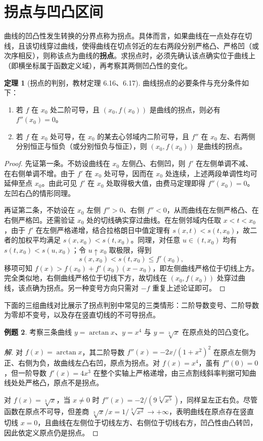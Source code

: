 \documentclass[UTF8,fontset=fandol,a4paper,12pt]{ctexart}
\theoremstyle{definition}
\newtheorem{theorem}{定理}[section]
\newtheorem{example}[theorem]{例题}
\begin{document}
\section{拐点与凹凸区间}
曲线的凹凸性发生转换的分界点称为拐点。具体而言，如果曲线在一点处存在切线，且该切线穿过曲线，使得曲线在切点邻近的左右两段分别严格凸、严格凹（或次序相反），则称该点为曲线的\textbf{拐点}。求拐点时，必须先确认该点确实位于曲线上（即横坐标属于函数定义域），再考察其两侧凹凸性的变化。

\begin{theorem}[拐点的判别，教材定理 6.16、6.17]
曲线拐点的必要条件与充分条件如下：
\begin{enumerate}
\item 若 $f$ 在 $x_0$ 处二阶可导，且 $(x_0,f(x_0))$ 是曲线的拐点，则必有 $f''(x_0)=0$。
\item 若 $f$ 在 $x_0$ 处可导，在 $x_0$ 的某去心邻域内二阶可导，且 $f''$ 在 $x_0$ 左、右两侧分别恒正与恒负（或分别恒负与恒正），则 $(x_0,f(x_0))$ 是曲线的拐点。
\end{enumerate}
\end{theorem}

\begin{proof}
先证第一条。不妨设曲线在 $x_0$ 左侧凸、右侧凹，则 $f'$ 在左侧单调不减、在右侧单调不增。由于 $f'$ 在 $x_0$ 处可导，因而在 $x_0$ 处连续，上述两段单调性均可延伸至点 $x_0$。由此可见 $f'$ 在 $x_0$ 处取得极大值，由费马定理即得 $f''(x_0)=0$。左凹右凸的情形同理。

再证第二条，不妨设在 $x_0$ 左侧 $f''>0$、右侧 $f''<0$，从而曲线在左侧严格凸、在右侧严格凹。还需验证 $x_0$ 处的切线确实穿过曲线。在左侧邻域内任取 $x<t<x_0$，由于 $f'$ 在左侧严格递增，结合拉格朗日中值定理有 $s(x,t)<s(t,x_0)$，故二者的加权平均满足 $s(x,x_0)<s(t,x_0)$。同理，对任意 $u\in(t,x_0)$ 均有 $s(t,x_0)<s(u,x_0)$；令 $u\uparrow x_0$ 取极限，得到
\[
 s(x,x_0)<s(t,x_0)\le f'(x_0),
\]
移项可知 $f(x)>f(x_0)+f'(x_0)(x-x_0)$，即左侧曲线严格位于切线上方。完全类似地，右侧曲线严格位于切线下方，故切线在 $(x_0,f(x_0))$ 处穿过曲线，该点确为拐点。另一种变号方向只需对 $-f$ 重复上述论证即可。
\end{proof}

下面的三组曲线对比展示了拐点判别中常见的三类情形：二阶导数变号、二阶导数为零却不变号，以及存在竖直切线的不可导拐点。

\begin{example}
考察三条曲线 $y=\arctan x$、$y=x^4$ 与 $y=\sqrt[3]{x}$ 在原点处的凹凸变化。
\end{example}

\begin{proof}[解]
对 $f(x)=\arctan x$，其二阶导数 $f''(x)=-2x/(1+x^2)^2$ 在原点左侧为正、右侧为负，故曲线左凸右凹，原点为拐点。对 $f(x)=x^4$，虽有 $f''(0)=0$，但一阶导数 $f'(x)=4x^3$ 在整个实轴上严格递增，由三点割线斜率判据可知曲线处处严格凸，原点不是拐点。

对 $f(x)=\sqrt[3]{x}$，当 $x\ne0$ 时 $f''(x)=-2/(9\sqrt[3]{x^5})$，同样呈左正右负。尽管函数在原点不可导，但差商 $\sqrt[3]{x}/x=1/\sqrt[3]{x^2}\to+\infty$，表明曲线在原点存在竖直切线 $x=0$，且曲线在左侧位于切线左方、右侧位于切线右方，凹凸性由凸转凹，因此依定义原点仍是拐点。
\end{proof}
\end{document}
